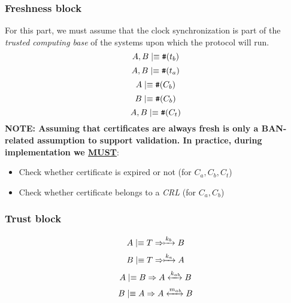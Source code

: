 \documentclass[twocolumn]{article}
\newcommand{\believes}{\mid\equiv}
\newcommand{\controls}{\Rightarrow}
\newcommand{\fresh}[1]{\text{\texttt{\#}}(#1)}
\newcommand{\sharekey}[1]{\xleftrightarrow{#1}}
\newcommand{\pubkey}[1]{\xmapsto{#1}}
\begin{document}
\subsubsection{Freshness block} For this part, we must assume that the clock synchronization is part of the \textit{trusted computing base} of the systems upon which the protocol will run.
\begin{equation}\label{hp:H.5}
A,B \believes \fresh{t_b}
\end{equation}
\begin{equation}\label{hp:H.6}
A,B \believes \fresh{t_a}
\end{equation}
\begin{equation}\label{hp:H.6s}
A \believes \fresh{C_b}
\end{equation}
\begin{equation}\label{hp:H.6s}
B \believes \fresh{C_b}
\end{equation}
\begin{equation}\label{hp:H.6s}
A,B \believes \fresh{C_t}
\end{equation}
\textbf{NOTE: Assuming that certificates are always fresh is only a BAN-related assumption to support validation. In practice, during implementation we \underline{MUST}}:
\begin{itemize}
	\item Check whether certificate is expired or not (for $C_a,C_b,C_t$)
	\item Check whether certificate belongs to a \textit{CRL} (for $C_a,C_b$) 
\end{itemize}
\subsubsection{Trust block}
\begin{equation}\label{hp:H.7}
A \believes T \controls  \pubkey{k_b} B
\end{equation}
\begin{equation}\label{hp:H.8}
B \believes T \controls  \pubkey{k_a} A
\end{equation}
\begin{equation} \label{hp:H.9}
A \believes B \controls A \sharekey{k_{ab}} B
\end{equation}
\begin{equation}\label{hp:H.10}
 B \believes A \controls A \sharekey{m_{ab}} B
\end{equation}

\end{document}
